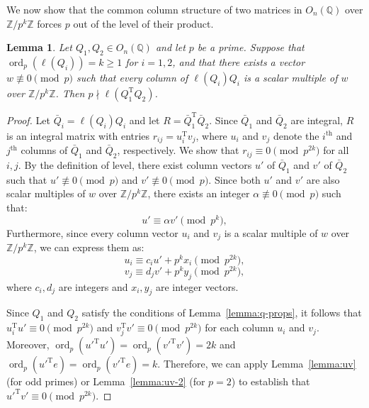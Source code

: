 \documentclass[12pt]{article}
\theoremstyle{plain}
\newtheorem{lemma}[theorem]{Lemma}
\theoremstyle{definition}
\newcommand{\trans}{^{\mathrm{T}}}
\begin{document}
We now show that the common column structure of two matrices in $O_n(\mathbb{Q})$ over $\mathbb{Z}/p^k\mathbb{Z}$ forces $p$ out of the level of their product.

\begin{lemma}
\label{lemma:p-out}
Let $Q_1, Q_2 \in O_n(\mathbb{Q})$ and let $p$ be a prime. Suppose that 
$\operatorname{ord}_p(\ell(Q_i)) = k \geq 1$ for $i=1,2$, and that there exists a vector $w \not\equiv 0 \pmod{p}$ such that every column 
of $\ell(Q_i)Q_i$ is a scalar multiple of $w$ 
over $\mathbb{Z}/p^k\mathbb{Z}$. Then $p \nmid \ell(Q_1\trans Q_2)$.
\end{lemma}

\begin{proof}
Let $\bar{Q}_i=\ell(Q_i)Q_i$ and let $R = \bar{Q}_1\trans \bar{Q}_2$. Since $\bar{Q}_1$ and $\bar{Q}_2$ are integral, $R$ is an integral matrix with entries $r_{ij} = u_i\trans v_j$, where $u_i$ and $v_j$ denote the $i^\text{th}$ and $j^\text{th}$ columns of $\bar{Q}_1$ and $\bar{Q}_2$, respectively. We show that $r_{ij} \equiv 0 \pmod{p^{2k}}$ for all $i, j$. By the definition of level, there exist column vectors $u'$ of $\bar{Q}_1$ and $v'$ of $\bar{Q}_2$ such that $u' \not\equiv 0 \pmod{p}$ and $v' \not\equiv 0 \pmod{p}$. Since both $u'$ and $v'$ are also scalar multiples of $w$ over $\mathbb{Z}/p^k\mathbb{Z}$, there exists an integer $\alpha \not\equiv 0\pmod{p}$ such that:
\begin{equation}
\label{eq:u'-v'}
u' \equiv \alpha v' \pmod{p^{k}},
\end{equation}
Furthermore, since every column vector $u_i$ and $v_j$ is a scalar multiple of $w$ over $\mathbb{Z}/p^k\mathbb{Z}$, we can express them as:
\begin{equation}
\label{eq:ui}
u_i \equiv c_i u' + p^{k}x_i \pmod{p^{2k}},
\end{equation}
\begin{equation}
\label{eq:vi}
v_j \equiv d_j v' + p^{k}y_j \pmod{p^{2k}},
\end{equation}
where $c_i, d_j$ are integers and $x_i, y_j$ are integer vectors.

Since $Q_1$ and $Q_2$ satisfy the conditions of Lemma~\ref{lemma:q-props}, it follows that $u_i\trans u' \equiv 0 \pmod{p^{2k}}$ and $v_j\trans v' \equiv 0\pmod{p^{2k}}$ for each column $u_i$ and $v_j$. Moreover, $\operatorname{ord}_p({u'}\trans u') = \operatorname{ord}_p({v'}\trans v') = 2k$ and $\operatorname{ord}_p({u'}\trans e) = \operatorname{ord}_p({v'}\trans e) = k$. Therefore, we can apply Lemma~\ref{lemma:uv} (for odd primes) or Lemma~\ref{lemma:uv-2} (for $p=2$) to establish that ${u'}\trans v' \equiv 0 \pmod{p^{2k}}$.


\end{proof}
\end{document}

